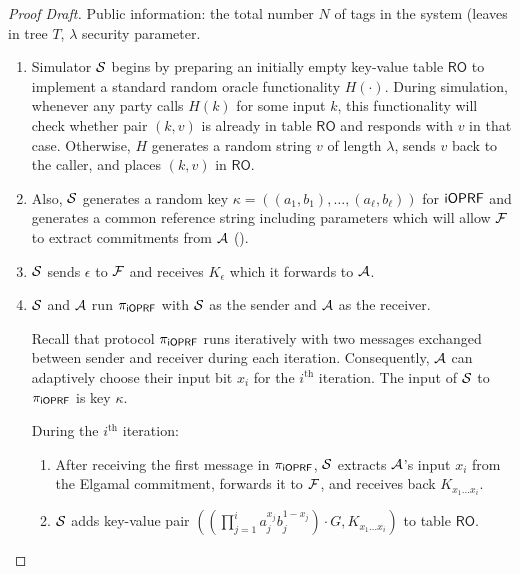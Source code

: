 \documentclass{article}
\begin{document}
\begin{proof}[Proof Draft]

Public information: the total number $N$ of tags in the system (leaves
in tree $T$, $\lambda$ security parameter.

  \begin{enumerate}

  \item Simulator ${\mathcal{S}}$ begins by preparing an initially empty
    key-value table $\mathsf{RO}$ to implement a standard random
    oracle functionality $H(\cdot)$. During simulation, whenever any
    party calls $H(k)$ for some input $k$, this functionality will
    check whether pair $(k,v)$ is already in table $\mathsf{RO}$ and
    responds with $v$ in that case. Otherwise, $H$ generates a random
    string $v$ of length $\lambda$, sends $v$ back to the caller, and
    places $(k,v)$ in $\mathsf{RO}$.

  \item Also, ${\mathcal{S}}$ generates a random key
    $\kappa=((a_1,b_1),\ldots,(a_\ell,b_\ell))$ for $\mathsf{i}\mathsf{OPRF}$ and generates
    a common reference string including parameters which will allow
    ${\mathcal{F}}$ to extract commitments from ${\mathcal{A}}$ ().

  \item ${\mathcal{S}}$ sends $\epsilon$ to ${\mathcal{F}}$ and receives $K_\epsilon$
    which it forwards to ${\mathcal{A}}$.
    
  \item ${\mathcal{S}}$ and ${\mathcal{A}}$ run ${\pi_{\mathsf{i}\mathsf{OPRF}}}$ with ${\mathcal{S}}$ as the sender and
    ${\mathcal{A}}$ as the receiver.

    Recall that protocol ${\pi_{\mathsf{i}\mathsf{OPRF}}}$ runs iteratively with two messages
    exchanged between sender and receiver during each
    iteration. Consequently, ${\mathcal{A}}$ can adaptively choose their input
    bit $x_i$ for the $i^\text{th}$ iteration. The input of ${\mathcal{S}}$ to
    ${\pi_{\mathsf{i}\mathsf{OPRF}}}$ is key $\kappa$.

    During the $i^\text{th}$ iteration:
    \begin{enumerate}
    \item After receiving the first message in ${\pi_{\mathsf{i}\mathsf{OPRF}}}$, ${\mathcal{S}}$
      extracts ${\mathcal{A}}$'s input $x_i$ from the Elgamal commitment,
      forwards it to ${\mathcal{F}}$, and receives back $K_{x_1\ldots{}x_i}$.

    \item ${\mathcal{S}}$ adds key-value pair
      $(( \prod_{j=1}^{i}
      a_j^{x_j}b_j^{1-x_j})\cdot{}G,K_{x_1\ldots{}x_i})$ to table
      $\mathsf{RO}$.
   
    \end{enumerate}
\end{enumerate}
\end{proof}
\end{document}

